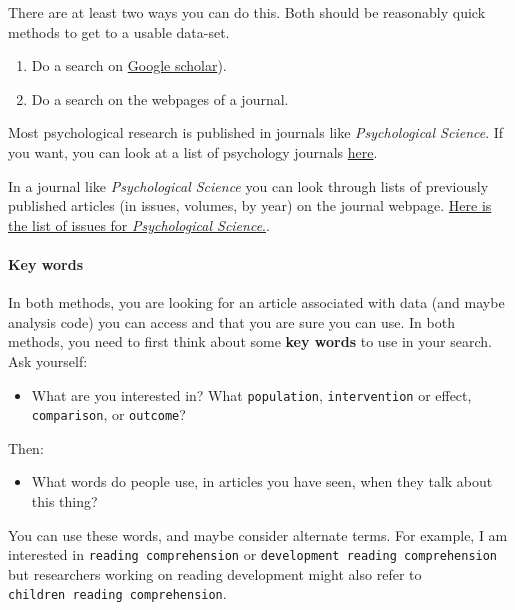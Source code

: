 \documentclass[
  letterpaper,
  DIV=11,
  numbers=noendperiod]{scrreprt}
\let\oldparagraph\paragraph
\renewcommand{\paragraph}[1]{\oldparagraph{#1}\mbox{}}
\providecommand{\tightlist}{%
  \setlength{\itemsep}{0pt}\setlength{\parskip}{0pt}}\usepackage{longtable,booktabs,array}
\begin{document}
There are at least two ways you can do this. Both should be reasonably
quick methods to get to a usable data-set.

\begin{enumerate}
\def\labelenumi{\arabic{enumi}.}
\tightlist
\item
  Do a search on \href{https://scholar.google.com}{Google scholar}).
\item
  Do a search on the webpages of a journal.
\end{enumerate}

Most psychological research is published in journals like
\emph{Psychological Science}. If you want, you can look at a list of
psychology journals
\href{https://en.wikipedia.org/wiki/List_of_psychology_journals}{here}.

In a journal like \emph{Psychological Science} you can look through
lists of previously published articles (in issues, volumes, by year) on
the journal webpage. \href{https://journals.sagepub.com/loi/PSS}{Here is
the list of issues for \emph{Psychological Science}.}.

\hypertarget{sec-keywords}{%
\paragraph{Key words}\label{sec-keywords}}

In both methods, you are looking for an article associated with data
(and maybe analysis code) you can access and that you are sure you can
use. In both methods, you need to first think about some \textbf{key
words} to use in your search. Ask yourself:

\begin{itemize}
\tightlist
\item
  What are you interested in? What \texttt{population},
  \texttt{intervention} or effect, \texttt{comparison}, or
  \texttt{outcome}?
\end{itemize}

Then:

\begin{itemize}
\tightlist
\item
  What words do people use, in articles you have seen, when they talk
  about this thing?
\end{itemize}

You can use these words, and maybe consider alternate terms. For
example, I am interested in \texttt{reading\ comprehension} or
\texttt{development\ reading\ comprehension} but researchers working on
reading development might also refer to
\texttt{children\ reading\ comprehension}.
\end{document}
